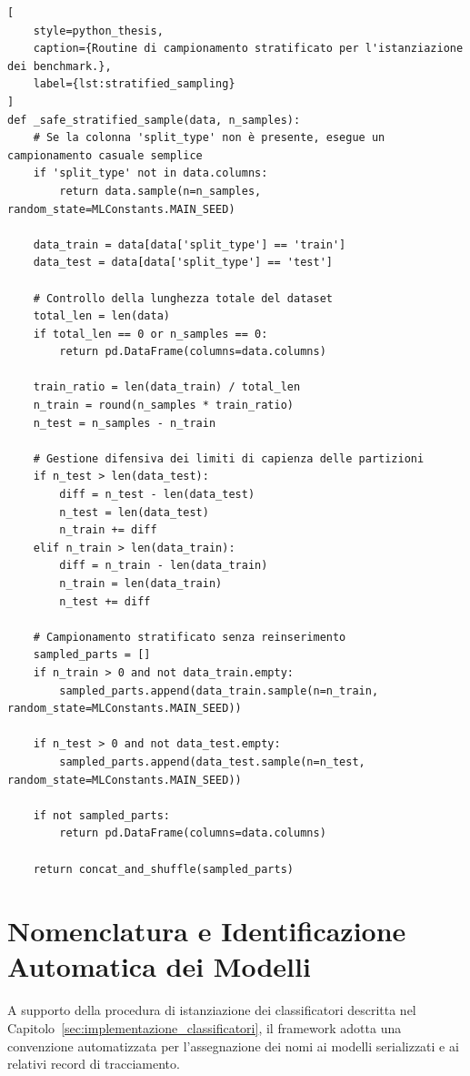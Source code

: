 \begin{lstlisting}[
    style=python_thesis,
    caption={Routine di campionamento stratificato per l'istanziazione dei benchmark.},
    label={lst:stratified_sampling}
]
def _safe_stratified_sample(data, n_samples):
    # Se la colonna 'split_type' non è presente, esegue un campionamento casuale semplice
    if 'split_type' not in data.columns:
        return data.sample(n=n_samples, random_state=MLConstants.MAIN_SEED)
    
    data_train = data[data['split_type'] == 'train']
    data_test = data[data['split_type'] == 'test']
    
    # Controllo della lunghezza totale del dataset
    total_len = len(data)
    if total_len == 0 or n_samples == 0:
        return pd.DataFrame(columns=data.columns)
    
    train_ratio = len(data_train) / total_len
    n_train = round(n_samples * train_ratio)
    n_test = n_samples - n_train
    
    # Gestione difensiva dei limiti di capienza delle partizioni
    if n_test > len(data_test):
        diff = n_test - len(data_test)
        n_test = len(data_test)
        n_train += diff
    elif n_train > len(data_train):
        diff = n_train - len(data_train)
        n_train = len(data_train)
        n_test += diff
    
    # Campionamento stratificato senza reinserimento
    sampled_parts = []
    if n_train > 0 and not data_train.empty:
        sampled_parts.append(data_train.sample(n=n_train, random_state=MLConstants.MAIN_SEED))

    if n_test > 0 and not data_test.empty:
        sampled_parts.append(data_test.sample(n=n_test, random_state=MLConstants.MAIN_SEED))

    if not sampled_parts:
        return pd.DataFrame(columns=data.columns)
        
    return concat_and_shuffle(sampled_parts)
\end{lstlisting}



\section{Nomenclatura e Identificazione Automatica dei Modelli}
\label{app:nomenclatura_modelli}

A supporto della procedura di istanziazione dei classificatori descritta nel Capitolo~\ref{sec:implementazione_classificatori}, il framework adotta una convenzione automatizzata per l'assegnazione dei nomi ai modelli serializzati e ai relativi record di tracciamento.

